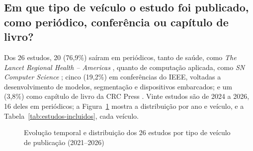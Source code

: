 \subsection{Em que tipo de veículo o estudo foi publicado, como periódico, conferência ou capítulo de livro?}
\label{subsec:rq8-veiculos}

Dos 26 estudos, 20 (76,9\%) saíram em periódicos, tanto de saúde, como
\textit{The Lancet Regional Health -- Americas} \cite{barbieri2022}, quanto de
computação aplicada, como \textit{SN Computer Science}
\cite{jitendra2024deep,jitendra2024heuristic,banerjee2023}; cinco (19,2\%) em conferências do IEEE, voltadas a
desenvolvimento de modelos, segmentação e dispositivos embarcados; e um
(3,8\%) como capítulo de livro da CRC Press \cite{lima2024skin}. Vinte estudos
são de 2024 a 2026, 16 deles em periódicos; a
Figura~\ref{fig:veiculos-evolucao} mostra a distribuição por ano e
veículo, e a Tabela~\ref{tab:estudos-incluidos}, cada veículo.

\begin{figure}[htbp]
	\centering
	\caption{Evolução temporal e distribuição dos 26 estudos por tipo de veículo de publicação (2021--2026)}
	\label{fig:veiculos-evolucao}
\end{figure}

